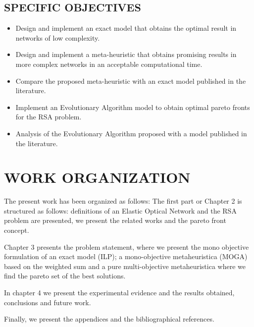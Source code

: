 \subsection{SPECIFIC OBJECTIVES}
\begin{itemize}
\item Design and implement an exact model that obtains the optimal result
in networks of low complexity. 
\item Design and implement a meta-heuristic that obtains promising results
in more complex networks in an acceptable computational time. 
\item Compare the proposed meta-heuristic with an exact model published
in the literature.
\item Implement an Evolutionary Algorithm model to obtain optimal pareto
fronts for the RSA problem.
\item Analysis of the Evolutionary Algorithm proposed with a model published
in the literature.
\end{itemize}

\section{WORK ORGANIZATION}

The present work has been organized as follows: The first part or
Chapter 2 is structured as follows: definitions of an Elastic Optical
Network and the RSA problem are presented, we present the related
works and the pareto front concept. 

Chapter 3 presents the problem statement, where we present the mono
objective formulation of an exact model (ILP); a mono-objective metaheuristica
(MOGA) based on the weighted sum and a pure multi-objective metaheuristica
where we find the pareto set of the best solutions. 

In chapter 4 we present the experimental evidence and the results
obtained, conclusions and future work. 

Finally, we present the appendices and the bibliographical references.
